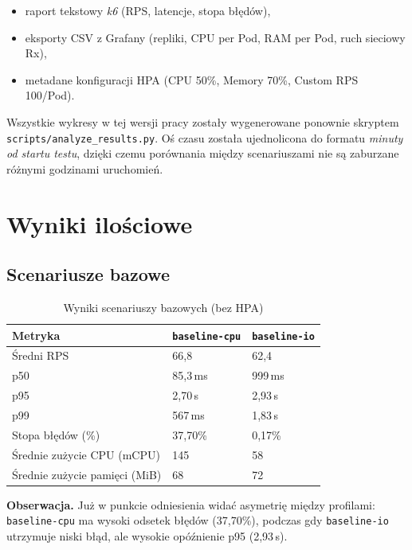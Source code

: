 \begin{itemize}
  \item raport tekstowy \textit{k6} (RPS, latencje, stopa błędów),
  \item eksporty CSV z Grafany (repliki, CPU per Pod, RAM per Pod, ruch sieciowy Rx),
  \item metadane konfiguracji HPA (CPU 50\%, Memory 70\%, Custom RPS 100/Pod).
\end{itemize}

Wszystkie wykresy w tej wersji pracy zostały wygenerowane ponownie skryptem \texttt{scripts/analyze\_results.py}. Oś czasu została ujednolicona do formatu \textit{minuty od startu testu}, dzięki czemu porównania między scenariuszami nie są zaburzane różnymi godzinami uruchomień.

\section{Wyniki ilościowe}

\subsection{Scenariusze bazowe}

\begin{table}[H]
  \centering
  \begin{tabularx}{\textwidth}{|l|X|X|}
    \hline
    \textbf{Metryka} & \texttt{baseline-cpu} & \texttt{baseline-io} \\
    \hline
    Średni RPS & 66{,}8 & 62{,}4 \\
    p50 & 85{,}3\,ms & 999\,ms \\
    p95 & 2{,}70\,s & 2{,}93\,s \\
    p99 & 567\,ms & 1{,}83\,s \\
    Stopa błędów (\%) & 37{,}70\% & 0{,}17\% \\
    Średnie zużycie CPU (mCPU) & 145 & 58 \\
    Średnie zużycie pamięci (MiB) & 68 & 72 \\
    \hline
  \end{tabularx}
  \caption{Wyniki scenariuszy bazowych (bez HPA)}
  \label{tab:baseline-results}
\end{table}

\textbf{Obserwacja.} Już w punkcie odniesienia widać asymetrię między profilami: \texttt{baseline-cpu} ma wysoki odsetek błędów (37{,}70\%), podczas gdy \texttt{baseline-io} utrzymuje niski błąd, ale wysokie opóźnienie p95 (2{,}93\,s).

